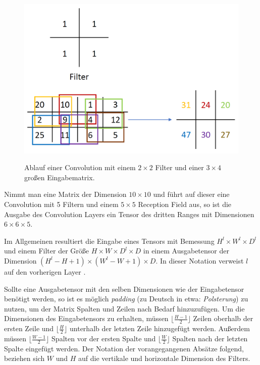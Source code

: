 \begin{figure}[H]
\centering
\includegraphics[scale=0.4]{pictures/grafiken/conv-bsp}
\label{fig:convbsp}
\caption{Ablauf einer Convolution mit einem $2 \times 2$ Filter und einer $3 \times 4$ großen Eingabematrix.}
\end{figure}

Nimmt man eine Matrix der Dimension $10 \times 10$ und führt auf dieser eine Convolution mit 5 Filtern und einem $5 \times 5$ Reception Field aus, so ist die Ausgabe des Convolution Layers ein Tensor des dritten Ranges mit Dimensionen $6 \times 6 \times 5$. 

Im Allgemeinen resultiert die Eingabe eines Tensors mit Bemessung $H^l \times W^l \times D^l$ und einem Filter der Größe $H \times W \times D^l \times D$ in einem Ausgabetensor der Dimension $(H^l - H + 1) \times (W^l - W + 1) \times D$. In dieser Notation verweist $l$ auf den vorherigen Layer \parencite{Wu.2017}.

Sollte eine Ausgabetensor mit den selben Dimensionen wie der Eingabetensor benötigt werden, so ist es möglich \textit{padding} (zu Deutsch in etwa: \textit{Polsterung}) zu nutzen, um der Matrix Spalten und Zeilen nach Bedarf hinzuzufügen. Um die Dimensionen des Eingabetensors zu erhalten, müssen $\lfloor \frac{H-1}{2} \rfloor$ Zeilen oberhalb der ersten Zeile und $\lfloor \frac{H}{2} \rfloor$ unterhalb der letzten Zeile hinzugefügt werden. Außerdem müssen $\lfloor \frac{W-1}{2} \rfloor$ Spalten vor der ersten Spalte und $\lfloor \frac{W}{2} \rfloor$ Spalten nach der letzten Spalte eingefügt werden. Der Notation der vorangegangenen Absätze folgend, beziehen sich $W$ und $H$ auf die vertikale und horizontale Dimension des Filters.


